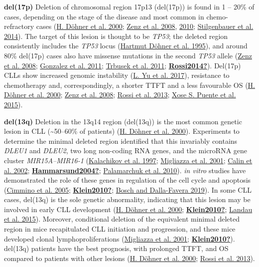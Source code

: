 \documentclass[11pt, a4paper, twosided]{book}
\begin{document}
\textbf{del(17p)}
Deletion of chromosomal region 17p13 (del(17p)) is found in 1 -- 20\% of cases, depending on the stage of the disease and most common in chemo-refractory cases (\protect\hyperlink{ref-Dohner2000}{H. Döhner et al. 2000}; \protect\hyperlink{ref-Zenz2008}{Zenz et al. 2008}, \protect\hyperlink{ref-Zenz2010}{2010}; \protect\hyperlink{ref-Stilgenbauer2014}{Stilgenbauer et al. 2014}). The target of this lesion is thought to be \emph{TP53}; the deleted region consistently includes the \emph{TP53} locus (\protect\hyperlink{ref-Dohner1995}{Hartmut Döhner et al. 1995}), and around 80\% del(17p) cases also have missense mutations in the second \emph{TP53} allele (\protect\hyperlink{ref-Zenz2008}{Zenz et al. 2008}; \protect\hyperlink{ref-Gonzalez2011}{Gonzalez et al. 2011}; \protect\hyperlink{ref-Trbusek2011}{Trbusek et al. 2011}; \protect\hyperlink{ref-Rossi2014}{\textbf{Rossi2014?}}). Del(17p) CLLs show increased genomic instability (\protect\hyperlink{ref-Yu2017}{L. Yu et al. 2017}), resistance to chemotherapy and, correspondingly, a shorter TTFT and a less favourable OS (\protect\hyperlink{ref-Dohner2000}{H. Döhner et al. 2000}; \protect\hyperlink{ref-Zenz2008}{Zenz et al. 2008}; \protect\hyperlink{ref-Rossi2013}{Rossi et al. 2013}; \protect\hyperlink{ref-Puente2015}{Xose S. Puente et al. 2015}).

\textbf{del(13q)}
Deletion in the 13q14 region (del(13q)) is the most common genetic lesion in CLL (\textasciitilde50--60\% of patients) (\protect\hyperlink{ref-Dohner2000}{H. Döhner et al. 2000}). Experiments to determine the minimal deleted region identified that this invariably contains \emph{DLEU1} and \emph{DLEU2}, two long non-coding RNA genes, and the microRNA gene cluster \emph{MIR15A--MIR16-1} (\protect\hyperlink{ref-Kalachikov1997}{Kalachikov et al. 1997}; \protect\hyperlink{ref-Migliazza2001}{Migliazza et al. 2001}; \protect\hyperlink{ref-Calin2002}{Calin et al. 2002}; \protect\hyperlink{ref-Hammarsund2004}{\textbf{Hammarsund2004?}}; \protect\hyperlink{ref-Palamarchuk2010}{Palamarchuk et al. 2010}). \emph{in vitro} studies have demonstrated the role of these genes in regulation of the cell cycle and apoptosis (\protect\hyperlink{ref-Cimmino2005}{Cimmino et al. 2005}; \protect\hyperlink{ref-Klein2010}{\textbf{Klein2010?}}; \protect\hyperlink{ref-Bosch2019}{Bosch and Dalla-Favera 2019}). In some CLL cases, del(13q) is the sole genetic abnormality, indicating that this lesion may be involved in early CLL development (\protect\hyperlink{ref-Dohner2000}{H. Döhner et al. 2000}; \protect\hyperlink{ref-Klein2010}{\textbf{Klein2010?}}; \protect\hyperlink{ref-Landau2015}{Landau et al. 2015}). Moreover, conditional deletion of the equivalent minimal deleted region in mice recapitulated CLL initiation and progression, and these mice developed clonal lymphoproliferations (\protect\hyperlink{ref-Migliazza2001}{Migliazza et al. 2001}; \protect\hyperlink{ref-Klein2010}{\textbf{Klein2010?}}). del(13q) patients have the best prognosis, with prolonged TTFT, and OS compared to patients with other lesions (\protect\hyperlink{ref-Dohner2000}{H. Döhner et al. 2000}; \protect\hyperlink{ref-Rossi2013}{Rossi et al. 2013}).
\end{document}
